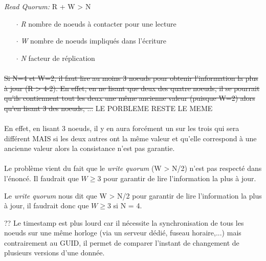 \item{}
{\faux}
{
\textit{Read Quorum:} R + W > N
\begin{itemize}
\item[$\cdot$]\textit{R} nombre de noeuds à contacter pour une lecture
\item[$\cdot$]\textit{W} nombre de noeuds impliqués dans l'écriture
\item[$\cdot$]\textit{N} facteur de réplication
\end{itemize}
\paragraph{}
\sout{Si N=4 et W=2, il faut lire au moins 3 noeuds pour obtenir l'information la plus à jour (R > 4-2). En effet, en ne lisant que deux des quatre noeuds, il se pourrait qu'ils contiennent tout les deux une même ancienne valeur (puisque W=2) alors qu'en lisant 3 des noeuds, ...  } \textcolor{dkred}{LE PORBLEME RESTE LE MEME}
\paragraph{}
En effet, en lisant 3 noeuds, il y en aura forcément un sur les trois qui sera différent MAIS si les deux autres ont la même valeur et qu'elle correspond à une ancienne valeur alors la consistance n'est pas garantie.
\paragraph{}
Le problème vient du fait que le \textit{write quorum} (W > N/2) n'est pas respecté dans l'énoncé. Il faudrait que $W \ge 3$ pour garantir de lire l'information la plus à jour.
}

\item{}
{\faux}
{
Le \textit{write quorum} nous dit que W > N/2 pour garantir de lire l'information la plus à jour, il faudrait donc que $W \ge 3$ si N = 4.
}


\item{}
{\faux ??}
{Le timestamp est plus lourd car il nécessite la synchronisation de tous les noeuds sur une même horloge (via un serveur dédié, fuseau horaire,...) mais contrairement au GUID, il permet de comparer l'instant de changement de plusieurs versions d'une donnée.}


\item{}
{\vrai}
{}

